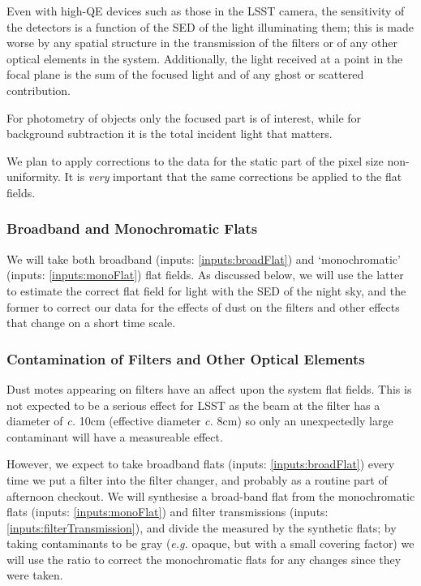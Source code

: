 \documentclass[12pt]{article}
\renewcommand{\c}{\textit{c.}\xspace}
\newcommand{\eg}{\textit{e.g.}\xspace}
\newcommand{\inputData}[1]{(inputs: \ref{inputs:#1})}
\begin{document}
Even with high-QE devices such as those in the LSST camera, the sensitivity of the detectors is a function of
the SED of the light illuminating them; this is made worse by any spatial structure in the transmission of the
filters or of any other optical elements in the system.  Additionally, the light received at a point in the
focal plane is the sum of the focused light and of any ghost or scattered contribution.

For photometry of objects only the focused part is of interest, while for background subtraction it is the
total incident light that matters.

We plan to apply corrections to the data for the static part of the pixel size non-uniformity.  It is
\textit{very} important that the same corrections be applied to the flat fields.

\subsubsection{Broadband and Monochromatic Flats}

We will take both broadband \inputData{broadFlat} and `monochromatic' \inputData{monoFlat} flat fields.
As discussed below, we will use the latter to estimate the correct flat field for light with the SED of the
night sky, and the former to correct our data for the effects of dust on the filters and other effects that
change on a short time scale.

\subsubsection{Contamination of Filters and Other Optical Elements}

Dust motes appearing on filters have an affect upon the system flat fields.  This is not expected to be
a serious effect for LSST as the beam at the filter has a diameter of \c 10cm (effective diameter \c 8cm)
so only an unexpectedly large contaminant will have a measureable effect.

However, we expect to take broadband flats \inputData{broadFlat} every time we put a filter into the filter
changer, and probably as a routine part of afternoon checkout.  We will synthesise a broad-band flat from the
monochromatic flats \inputData{monoFlat} and filter transmissions \inputData{filterTransmission}, and divide the
measured by the synthetic flats; by taking contaminants to be gray (\eg opaque, but with a small covering
factor) we will use the ratio to correct the monochromatic flats for any changes since they were taken.
\end{document}
